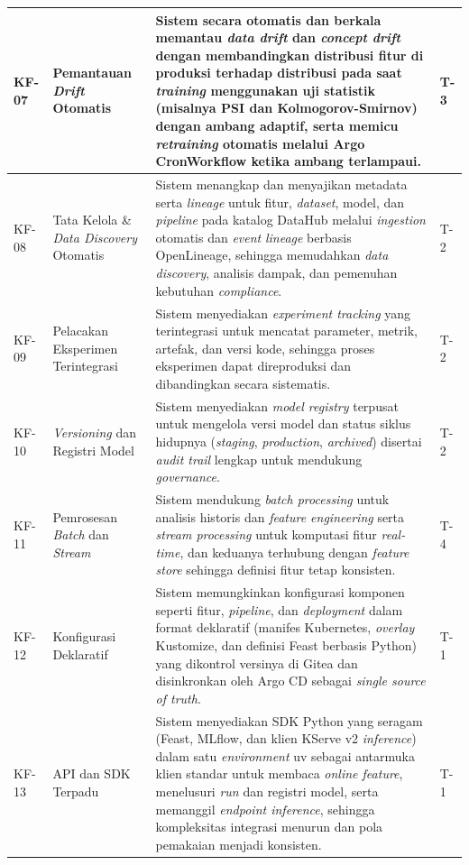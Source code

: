 {\begin{longtable}{|>{\centering\arraybackslash}m{0.75cm}|m{2cm}|m{8.55cm}|>{\centering\arraybackslash}m{1.75cm}|}
\hline
KF-07 & Pemantauan \textit{Drift} Otomatis & Sistem secara otomatis dan berkala memantau \textit{data drift} dan \textit{concept drift} dengan membandingkan distribusi fitur di produksi terhadap distribusi pada saat \textit{training} menggunakan uji statistik (misalnya PSI dan Kolmogorov-Smirnov) dengan ambang adaptif, serta memicu \textit{retraining} otomatis melalui Argo CronWorkflow ketika ambang terlampaui. & T-3 \\
\hline
KF-08 & Tata Kelola \& \textit{Data Discovery} Otomatis & Sistem menangkap dan menyajikan metadata serta \textit{lineage} untuk fitur, \textit{dataset}, model, dan \textit{pipeline} pada katalog DataHub melalui \textit{ingestion} otomatis dan \textit{event} \textit{lineage} berbasis OpenLineage, sehingga memudahkan \textit{data discovery}, analisis dampak, dan pemenuhan kebutuhan \textit{compliance}. & T-2 \\
\hline
KF-09 & Pelacakan Eksperimen Terintegrasi & Sistem menyediakan \textit{experiment tracking} yang terintegrasi untuk mencatat parameter, metrik, artefak, dan versi kode, sehingga proses eksperimen dapat direproduksi dan dibandingkan secara sistematis. & T-2 \\
\hline
KF-10 & \textit{Versioning} dan Registri Model & Sistem menyediakan \textit{model registry} terpusat untuk mengelola versi model dan status siklus hidupnya (\textit{staging}, \textit{production}, \textit{archived}) disertai \textit{audit trail} lengkap untuk mendukung \textit{governance}. & T-2 \\
\hline
KF-11 & Pemrosesan \textit{Batch} dan \textit{Stream} & Sistem mendukung \textit{batch processing} untuk analisis historis dan \textit{feature engineering} serta \textit{stream processing} untuk komputasi fitur \textit{real-time}, dan keduanya terhubung dengan \textit{feature store} sehingga definisi fitur tetap konsisten. & T-4 \\
\hline
KF-12 & Konfigurasi Deklaratif & Sistem memungkinkan konfigurasi komponen seperti fitur, \textit{pipeline}, dan \textit{deployment} dalam format deklaratif (manifes Kubernetes, \textit{overlay} Kustomize, dan definisi Feast berbasis Python) yang dikontrol versinya di Gitea dan disinkronkan oleh Argo CD sebagai \textit{single source of truth}. & T-1 \\
\hline
KF-13 & API dan SDK Terpadu & Sistem menyediakan SDK Python yang seragam (Feast, MLflow, dan klien KServe v2 \textit{inference}) dalam satu \textit{environment} uv sebagai antarmuka klien standar untuk membaca \textit{online feature}, menelusuri \textit{run} dan registri model, serta memanggil \textit{endpoint inference}, sehingga kompleksitas integrasi menurun dan pola pemakaian menjadi konsisten. & T-1 \\

\end{longtable}}
